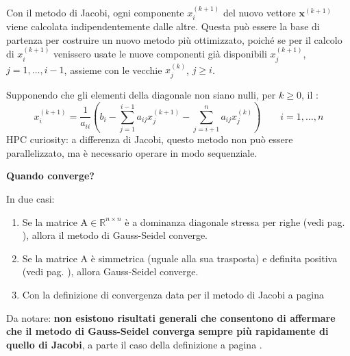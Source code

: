 Con il metodo di Jacobi, ogni componente $x_{i}^{\left(k+1\right)}$ del nuovo vettore $\mathbf{x}^{\left(k+1\right)}$ viene calcolata indipendentemente dalle altre. Questa può essere la base di partenza per costruire un nuovo metodo più ottimizzato, poiché se per il calcolo di $x_{i}^{\left(k+1\right)}$ venissero usate le nuove componenti già disponibili $x_{j}^{\left(k+1\right)}$, $j = 1, \dots, i-1$, assieme con le vecchie $x_{j}^{\left(k\right)}$, $j \ge i$.

\highspace
Supponendo che gli elementi della diagonale non siano nulli, per $k \ge 0$, il :
\begin{equation}\label{eq: metodo di Gauss-Seidel}
    x_{i}^{\left(k+1\right)} = 
    \dfrac{1}{a_{ii}} \left(
        b_{i} -
        \displaystyle\sum_{j=1}^{i-1} a_{ij}x_{j}^{\left(k+1\right)} -
        \displaystyle\sum_{j=i+1}^{n} a_{ij}x_{j}^{\left(k\right)}
    \right)
    \hspace{2em}
    i = 1, \dots, n
\end{equation}
HPC curiosity: a differenza di Jacobi, questo metodo non può essere parallelizzato, ma è necessario operare in modo sequenziale.

\begin{flushleft}
    \textcolor{Green3}{ \textbf{Quando converge?}}
\end{flushleft}
In due casi:
\begin{enumerate}
    \item Se la matrice $\mathrm{A} \in \mathbb{R}^{n \times n}$ è a dominanza diagonale stressa per righe (vedi pag. \pageref{dominanza diagonale stressa per righe}), allora il metodo di Gauss-Seidel converge.

    \item Se la matrice $\mathrm{A}$ è simmetrica (uguale alla sua trasposta) e definita positiva (vedi pag. \pageref{matrice definita positiva}), allora Gauss-Seidel converge.

    \item Con la definizione di convergenza data per il metodo di Jacobi a pagina \pageref{definizione: convergenza di Jacobi e Gauss-Seidel}
\end{enumerate}
Da notare: \textbf{non esistono risultati generali che consentono di affermare che il metodo di Gauss-Seidel converga sempre più rapidamente di quello di Jacobi}, a parte il caso della definizione a pagina \pageref{matrice definita positiva}.
